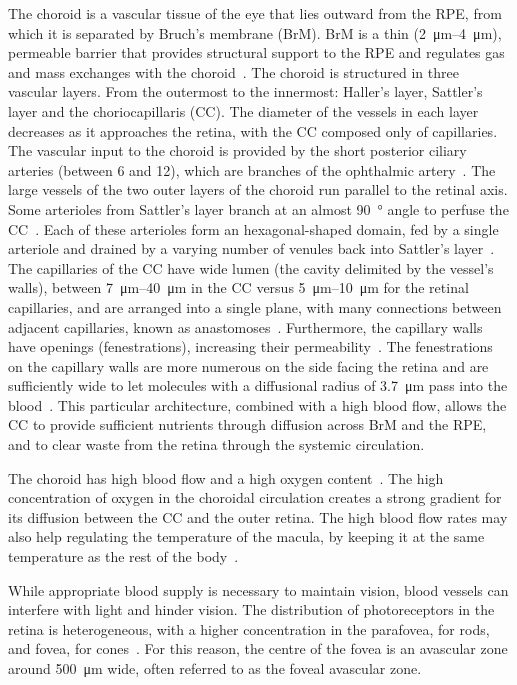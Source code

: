 \documentclass{article}
\begin{document}
The choroid is a vascular tissue of the eye that lies outward from the RPE, from which it is separated by Bruch's membrane (BrM).
BrM is a thin (\SIrange{2}{4}{\micro\meter}), permeable barrier that provides structural support to the RPE and regulates gas and mass exchanges with the choroid~\cite{Curcio_2013}.
The choroid is structured in three vascular layers.
From the outermost to the innermost: Haller's layer, Sattler's layer and the choriocapillaris (CC).
The diameter of the vessels in each layer decreases as it approaches the retina, with the CC composed only of capillaries.
The vascular input to the choroid is provided by the short posterior ciliary arteries (between 6 and 12), which are branches of the ophthalmic artery~\cite{Kiel_2011}.
The large vessels of the two outer layers of the choroid run parallel to the retinal axis.
Some arterioles from Sattler's layer branch at an almost \SI{90}{\degree} angle to perfuse the CC~\cite{Nickla_2010}.
Each of these arterioles form an hexagonal-shaped domain, fed by a single arteriole and drained by a varying number of venules back into Sattler's layer~\cite{Zouache_2016}.
The capillaries of the CC have wide lumen (the cavity delimited by the vessel's walls), between \SIrange{7}{40}{\micro\meter} in the CC versus \SIrange{5}{10}{\micro\meter} for the retinal capillaries, and are arranged into a single plane, with many connections between adjacent capillaries, known as anastomoses~\cite{Bill_1983, ChanLing_2011,Fryczkowski_1994}.
Furthermore, the capillary walls have openings (fenestrations), increasing their permeability~\cite{Nickla_2010}.
The fenestrations on the capillary walls are more numerous on the side facing the retina and are sufficiently wide to let molecules with a diffusional radius of \SI{3.7}{\micro\meter} pass into the blood~\cite{Nickla_2010, Bill_1983}.
This particular architecture, combined with a high blood flow, allows the CC to provide sufficient nutrients through diffusion across BrM and the RPE, and to clear waste from the retina through the systemic circulation.

The choroid has high blood flow and a high oxygen content~\cite{Bill_1983}.
The high concentration of oxygen in the choroidal circulation creates a strong gradient for its diffusion between the CC and the outer retina.
The high blood flow rates may also help regulating the temperature of the macula, by keeping it at the same temperature as the rest of the body~\cite{Bill_1983, Parver_1991}.

While appropriate blood supply is necessary to maintain vision, blood vessels can interfere with light and hinder vision.
The distribution of photoreceptors in the retina is heterogeneous, with a higher concentration in the parafovea, for rods, and fovea, for cones~\cite{Zouache_2022}.
For this reason, the centre of the fovea is an avascular zone around \SI{500}{\micro\meter} wide, often referred to as the foveal avascular zone.
\end{document}
